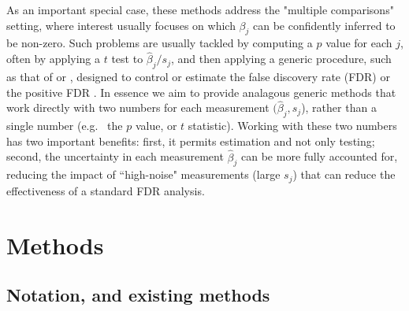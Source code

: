 \documentclass[11pt]{article}
\def\bhat{\hat{\beta}}
\begin{document}
As an important special case, these methods address the "multiple comparisons" setting, where interest usually focuses on which $\beta_j$ can be confidently inferred to be non-zero. Such problems are usually tackled by computing a $p$ value for each $j$, often by applying a $t$ test to $\bhat_j/s_j$,
and then applying a generic procedure, such as that of \cite{benjamini1995controlling} or \cite{storey2003statistical}, designed to control or
estimate the false discovery rate (FDR) or the positive FDR \cite{storey.03}. In essence we aim to provide analagous
generic methods that work directly with two numbers for each 
measurement $(\bhat_j,s_j$), rather than a single number (e.g.~ the $p$ value, or $t$ statistic). Working with these two numbers has two important benefits: first, it permits estimation and not only testing; second, the 
uncertainty in each measurement $\bhat_j$ can be more fully accounted for, reducing the impact of ``high-noise" measurements (large $s_j$) that can reduce the effectiveness of a standard FDR analysis. 

\def\df{df}
\def\FDR{\text{FDR}}
\def\fdr{\text{lfdr}}

 \section*{Methods}
 
 \subsection*{Notation, and existing methods}
 
\end{document}
